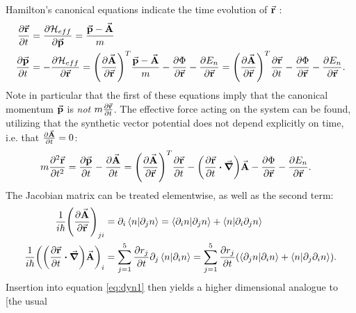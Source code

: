 \documentclass[a4paper]{article}
\begin{document}
Hamilton's canonical equations indicate the time evolution of \(\va{r}\) :%
\begin{align*} %
        \frac{\partial \va{r}}{\partial t} &= \frac{\partial \mathbb{\cal H}_{eff}}{\partial \va{p}} = \frac{\va{p} -
 \va{A}}{m}\\ %
                \frac{\partial \va{p}}{\partial t}  &= -\frac{\partial \mathbb{\cal H}_{eff}}{\partial \va{r}}=
                \pqty{\frac{\partial
 \va{A}}{\partial \va{r}}}^T \frac{\va{p}-\va{A}}{m} -\frac{\partial \Phi}{\partial \va{r}}
 -\frac{\partial E_n}{\partial \va{r}} = \pqty{\frac{\partial
 \va{A}}{\partial \va{r}}}^T \frac{\partial \va{r}}{\partial t} - \frac{\partial
\Phi}{\partial \va{r}} - \frac{\partial E_n}{\partial \va{r}}  
.\end{align*}
Note in particular that the first of these equations imply that the canonical momentum \(\va{p}\) is
\textit{not} \(m \frac{\partial \va{r}}{\partial t} \). The effective force acting on the
system can be found, utilizing that the synthetic vector potential does not depend explicitly
on time, i.e. that \(\frac{\partial \va{A}}{\partial t}  = 0\):
\begin{align}\label{eq:dyn1}
        m \frac{\partial^2 \va{r}}{\partial t^2} &= \frac{\partial \va{p}}{\partial
        t} - \frac{\partial \va{A}}{\partial t}  = \pqty{\frac{\partial \va{A}}{\partial \va{r}}}^T \frac{\partial
\va{r}}{\partial t} - \pqty{\frac{\partial \va{r}}{\partial t}  \vdot \grad}\va{A}
-\frac{\partial \Phi}{\partial \va{r}} - \frac{\partial E_n}{\partial \va{r}}  
.\end{align}
The Jacobian matrix can be treated elementwise, as well as the second term: 
\begin{align*}
        \frac{1}{i\hbar{}}\pqty{\frac{\partial \va{A}}{\partial \va{r}}}_{ji} &= \partial_i
        \bra{n}\ket{\partial_j n} = \bra{\partial_i n}\ket{\partial_j n} +
        \bra{n}\ket{\partial_i \partial_j n}\\
        \frac{1}{i\hbar{}}\pqty{\pqty{\frac{\partial \va{r}}{\partial t} \vdot \grad}
\va{A}}_i &= \sum_{j=1}^{5} \frac{\partial r_j}{\partial t} \partial_j
                \bra{n}\ket{\partial_i n} =\sum_{j=1}^{5}  \frac{\partial r_j}{\partial
                        t}\pqty{ \bra{\partial_j
                n}\ket{\partial_i n} + \bra{n}\ket{\partial_j \partial_i n}}
.\end{align*}
Insertion into equation \ref{eq:dyn1} then yields a higher dimensional analogue to [the usual
\end{document}

